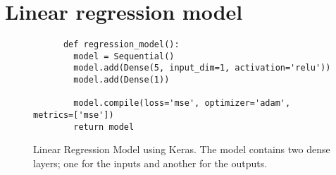 \section{Linear regression model}
\begin{figure}[!ht]
  \begin{code}
    \begin{verbatim}
      def regression_model():
        model = Sequential()
        model.add(Dense(5, input_dim=1, activation='relu'))
        model.add(Dense(1))

        model.compile(loss='mse', optimizer='adam', metrics=['mse'])
        return model
    \end{verbatim}
    \caption{Linear Regression Model using Keras. The model contains two dense layers; one for the inputs and another for the outputs.}
    \label{code:regression_model}
  \end{code}
\end{figure}